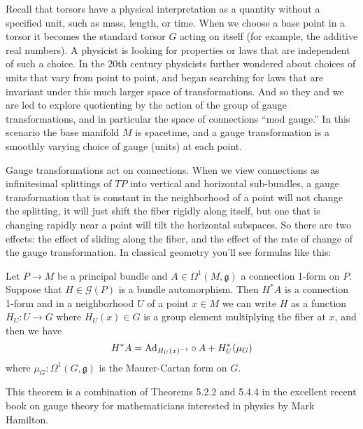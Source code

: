 Recall that torsors have a physical interpretation as a quantity without a specified unit, such as mass, length, or time. When we choose a base point in a torsor it becomes the standard torsor \( G \) acting on itself (for example, the additive real numbers). A physicist is looking for properties or laws that are independent of such a choice. In the 20th century physicists further wondered about choices of units that vary from point to point, and began searching for laws that are invariant under this much larger space of transformations. And so they and we are led to explore quotienting by the action of the group of gauge transformations, and in particular the space of connections ``mod gauge.'' In this scenario the base manifold \( M \) is spacetime, and a gauge transformation is a smoothly varying choice of gauge (units) at each point.

Gauge transformations act on connections. When we view connections as infinitesimal splittings of \( TP \) into vertical and horizontal sub-bundles, a gauge transformation that is constant in the neighborhood of a point will not change the splitting, it will just shift the fiber rigidly along itself, but one that is changing rapidly near a point will tilt the horizontal subspaces. So there are two effects: the effect of sliding along the fiber, and the effect of the rate of change of the gauge transformation. In classical geometry you'll see formulas like this:

\begin{mythm}
Let \( P\to M \) be a principal bundle and \( A\in\Omega^1(M,\mathfrak{g}) \) a connection 1-form on \( P \). Suppose that \( H\in \mathscr{G}(P) \) is a bundle automorphism. Then \( H^*A \) is a connection 1-form and in a neighborhood \( U \) of a point \( x\in M \) we can write \( H \) as a function \( H_U:U\to G \) where \( H_U(x)\in G \) is a group element multiplying the fiber at \( x \), and then we have
\[ 
H^*A=\mathrm{Ad}_{H_U(x)^{-1}}\circ A + H_U^*(\mu_G)
\] where \( \mu_G:\Omega^1(G,\mathfrak{g}) \) is the Maurer-Cartan form on \( G \).
\end{mythm}

This theorem is a combination of Theorems 5.2.2 and 5.4.4 in the excellent recent book on gauge theory for mathematicians interested in physics by Mark Hamilton\cite{hamilton2017}.

